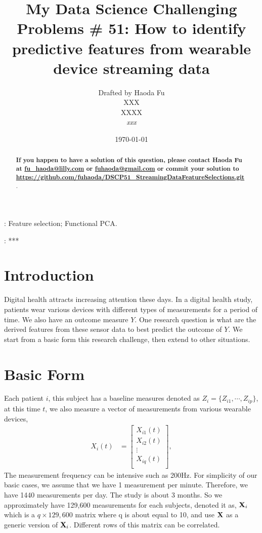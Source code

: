\documentclass[12pt]{article}
\def\bX{{\bf X}}
\begin{document}
\title
{\bf My Data Science Challenging Problems \# 51: How to identify predictive features from wearable device streaming data}
\author
{
Drafted by Haoda Fu\\
XXX \\
XXXX \\
\textsl{xxx} }
\date{\today}

\maketitle
\begin{abstract}
\textbf{{\color[rgb]{1,0,0} If you happen to have a solution of this question, please contact Haoda Fu at \href{mailto:fu\_haoda@lilly.com }{fu\_haoda@lilly.com} or  \href{mailto:ffuhaoda@gmail.com}{fuhaoda@gmail.com}  or commit your solution to \url{https://github.com/fuhaoda/DSCP51_StreamingDataFeatureSelections.git} }
}. 

\end{abstract}
: Feature selection; Functional PCA.

: ***
\section{Introduction}
Digital health attracts increasing attention these days. In a digital health study,  patients wear various devices with different types of measurements for a period of time. We also have an outcome measure $Y$. One research question is what are the derived features from these sensor data to best predict the outcome of $Y$. We start from a basic form this research challenge, then extend to other situations.
\section{Basic Form}
Each patient $i$, this subject has a baseline measures denoted as $Z_i=\{Z_{i1}, \cdots, Z_{ip}\}$, at this time $t$, we also measure a vector of measurements from various wearable devices,
\begin{align*}
X_i(t)&=\left[\begin{array}{c}
X_{i1}(t)	\\
X_{i2}(t)	\\
\vdots	\\
X_{iq}(t)	\\
\end{array}\right],
\end{align*}
The measurement frequency can be intensive such as 200Hz. For simplicity of our basic cases, we assume that we have 1 measurement per minute. Therefore, we have 1440 measurements per day. The study is about 3 months. So we approximately have 129,600 measurements for each subjects, denoted it as, $\bX_i$ which is a $q \times 129,600$ matrix where q is about equal to 10, and use $\bX$ as a generic version of $\bX_i$. Different rows of this matrix can be correlated. 
\end{document}
